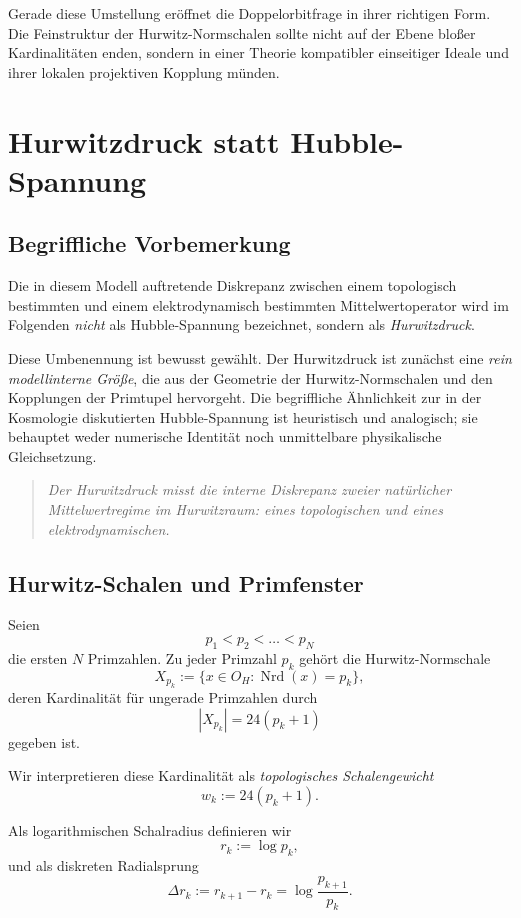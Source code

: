 \documentclass[12pt,a4paper]{article}
\theoremstyle{definition}
\begin{document}
	Gerade diese Umstellung eröffnet die Doppelorbitfrage in ihrer richtigen Form. Die Feinstruktur der Hurwitz-Normschalen sollte nicht auf der Ebene bloßer Kardinalitäten enden, sondern in einer Theorie kompatibler einseitiger Ideale und ihrer lokalen projektiven Kopplung münden.
	\section{Hurwitzdruck statt Hubble-Spannung}
	
	\subsection{Begriffliche Vorbemerkung}
	
	Die in diesem Modell auftretende Diskrepanz zwischen einem topologisch bestimmten und einem elektrodynamisch bestimmten Mittelwertoperator wird im Folgenden \emph{nicht} als Hubble-Spannung bezeichnet, sondern als \emph{Hurwitzdruck}.
	
	Diese Umbenennung ist bewusst gewählt. Der Hurwitzdruck ist zunächst eine \emph{rein modellinterne Größe}, die aus der Geometrie der Hurwitz-Normschalen und den Kopplungen der Primtupel hervorgeht. Die begriffliche Ähnlichkeit zur in der Kosmologie diskutierten Hubble-Spannung ist heuristisch und analogisch; sie behauptet weder numerische Identität noch unmittelbare physikalische Gleichsetzung.
	
	\begin{quote}
		\emph{Der Hurwitzdruck misst die interne Diskrepanz zweier natürlicher Mittelwertregime im Hurwitzraum: eines topologischen und eines elektrodynamischen.}
	\end{quote}
	
	\subsection{Hurwitz-Schalen und Primfenster}
	
	Seien
	\[
	p_1<p_2<\dots<p_N
	\]
	die ersten \(N\) Primzahlen. Zu jeder Primzahl \(p_k\) gehört die Hurwitz-Normschale
	\[
	X_{p_k}:=\{x\in O_H:\operatorname{Nrd}(x)=p_k\},
	\]
	deren Kardinalität für ungerade Primzahlen durch
	\[
	|X_{p_k}|=24(p_k+1)
	\]
	gegeben ist.
	
	Wir interpretieren diese Kardinalität als \emph{topologisches Schalengewicht}
	\[
	w_k:=24(p_k+1).
	\]
	
	Als logarithmischen Schalradius definieren wir
	\[
	r_k:=\log p_k,
	\]
	und als diskreten Radialsprung
	\[
	\Delta r_k:=r_{k+1}-r_k=\log\!\frac{p_{k+1}}{p_k}.
	\]
	
\end{document}
